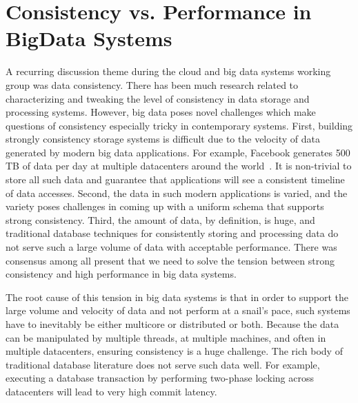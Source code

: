 \section{Consistency vs. Performance in BigData Systems}
A recurring discussion theme during the cloud and big data systems working
group was data consistency.  There has been much research related to
characterizing and tweaking the level of consistency in data storage and
processing systems.  However, big data poses novel challenges which make
questions of consistency especially tricky in contemporary systems.  First,
building strongly consistency storage systems is difficult due to the velocity
of data generated by modern big data applications.  For example, Facebook
generates 500 TB of data per day at multiple datacenters around the
world~\cite{fb_size}.  It is non-trivial to store all such data and guarantee
that applications will see a consistent timeline of data accesses.  Second, the
data in such modern applications is varied, and the variety poses challenges in
coming up with a uniform schema that supports strong consistency.  Third, the
amount of data, by definition, is huge, and traditional database techniques for
consistently storing and processing data do not serve such a large volume of
data with acceptable performance.  There was consensus among all present that
we need to solve the tension between strong consistency and high performance in
big data systems.

The root cause of this tension in big data systems is that in order to support
the large volume and velocity of data and not perform at a snail's pace, such
systems have to inevitably be either multicore or distributed or both.  Because
the data can be manipulated by multiple threads, at multiple machines, and often
in multiple datacenters, ensuring consistency is a huge challenge.  The rich
body of traditional database literature does not serve such data well.  For
example, executing a database transaction by performing two-phase locking across
datacenters will lead to very high commit latency.

